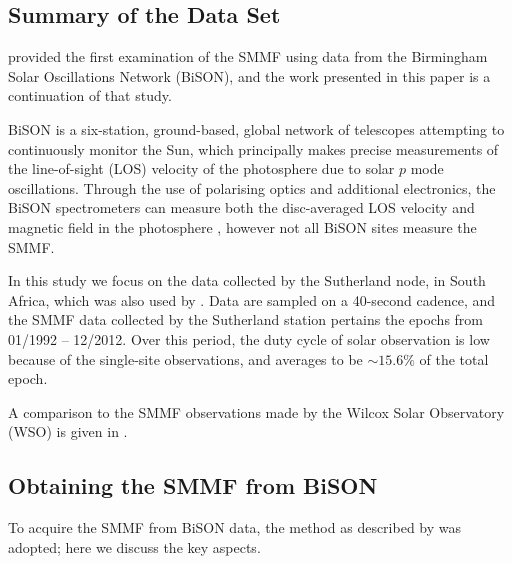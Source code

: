 \subsection{Summary of the Data Set}

\citet{chaplin_studies_2003} provided the first examination of the SMMF using data from the Birmingham Solar Oscillations Network (BiSON), and the work presented in this paper is a continuation of that study. 

BiSON is a six-station, ground-based, global network of telescopes attempting to continuously monitor the Sun, which principally makes precise measurements of the line-of-sight (LOS) velocity of the photosphere due to solar $p$ mode oscillations. Through the use of polarising optics and additional electronics, the BiSON spectrometers can measure both the disc-averaged LOS velocity and magnetic field in the photosphere \citep{chaplin_studies_2003}, however not all BiSON sites measure the SMMF. 

In this study we focus on the data collected by the Sutherland node, in South Africa, which was also used by \cite{chaplin_studies_2003}. Data are sampled on a 40-second cadence, and the SMMF data collected by the Sutherland station pertains the epochs from 01/1992 -- 12/2012. Over this period, the duty cycle of solar observation is low because of the single-site observations, and averages to be $\sim 15.6\%$ of the total epoch.

A comparison to the SMMF observations made by the Wilcox Solar Observatory (WSO) is given in \citep{chaplin_studies_2003}.



\subsection{Obtaining the SMMF from BiSON}

To acquire the SMMF from BiSON data, the method as described by \citet{chaplin_studies_2003} was adopted; here we discuss the key aspects.

